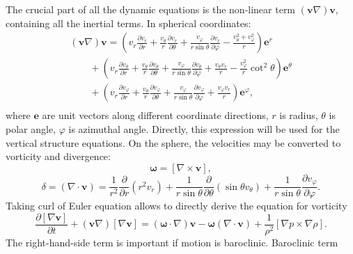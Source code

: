 \documentclass[usenatbib,onecolumn]{mnras}
\renewcommand{\vector}[1]{\ensuremath{\mathbf{#1}}}
\newcommand{\pardir}[2]{\ensuremath{\frac{\partial #2}{\partial #1} }}
\newcommand{\ppardir}[2]{\ensuremath{\frac{\partial }{\partial #1} \left( #2\right)}}
\begin{document}
The crucial part of all the dynamic equations is the non-linear term
$(\vector{v}\nabla) \vector{v}$, containing all the inertial terms. In
spherical coordinates:
\begin{equation}\label{E:vdv}
  \begin{array}{l}
\displaystyle  (\vector{v}\nabla) \vector{v} = \left( v_r \pardir{r}{v_r} +
  \frac{v_\theta}{r} \pardir{\theta}{v_r} + \frac{v_\varphi}{r \sin
    \theta} \pardir{\varphi}{v_r} - \frac{v_\theta^2+v_\varphi^2}{r}\right)
  \vector{e}^r  \\
\displaystyle   \qquad{}   + \left( v_r \pardir{r}{v_\theta} + \frac{v_\theta}{r}\pardir{\theta}{v_\theta} +
  \frac{v_\varphi}{r\sin\theta} \pardir{\varphi}{v_\theta} + \frac{v_\theta
    v_r}{r} - \frac{v_\varphi^2}{r}\cot^2\theta\right) \vector{e}^\theta
   \\
\displaystyle   \qquad{}   +
   \left( v_r \pardir{r}{v_\varphi}  + 
   \frac{v_\theta}{r}\pardir{\theta}{v_\varphi} +
   \frac{v_\varphi}{r\sin\theta}\pardir{\varphi}{v_\varphi} + \frac{v_\varphi
     v_r}{r}\right) \vector{e}^\varphi,\\
   \end{array}
\end{equation}
where $\vector{e}$ are unit vectors along different coordinate directions, $r$
is radius, $\theta$ is polar angle, $\varphi$ is azimuthal
angle. Directly, this expression will be used for the vertical structure
equations. On the sphere, the velocities may be converted to
vorticity  and divergence:
\begin{equation}\label{E:vort}
  \displaystyle   \vector{\omega} = \left[ \nabla \times \vector{v}\right],
\end{equation}
\begin{equation}\label{E:div}
\displaystyle   \delta = (\nabla \cdot \vector{v}) = \frac{1}{r^2}\ppardir{r}{r^2v_r} +
  \frac{1}{r\sin \theta} \ppardir{\theta}{\sin \theta v_\theta} + \frac{1}{r\sin \theta}\pardir{\varphi}{v_\varphi} .
\end{equation}
Taking curl of Euler equation allows to directly derive the equation for
vorticity
\begin{equation}\label{E:Ecurl}
\displaystyle   \pardir{t}{\left[\nabla \vector{v}\right]} +
  (\vector{v}\nabla)\left[\nabla \vector{v}\right] = (\vector{\omega} \cdot
\nabla) \vector{v} - \vector{\omega} (\nabla \cdot \vector{v}) +
  \frac{1}{\rho^2}\left[\nabla p \times \nabla \rho \right].
\end{equation}
The right-hand-side term is important if motion is baroclinic. Baroclinic term
\end{document}
